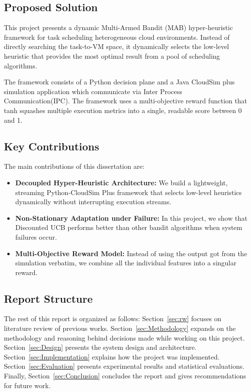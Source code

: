 \subsection{Proposed Solution}
This project presents a dynamic Multi-Armed Bandit (MAB) hyper-heuristic framework for task scheduling heterogeneous cloud environments. Instead of directly searching the task-to-VM space, it dynamically selects the low-level heuristic that provides the most optimal result from a pool of scheduling algorithms.

The framework consists of a Python decision plane and a Java CloudSim plus simulation application which communicate via Inter Process Communication(IPC). The framework uses a multi-objective reward function that tanh squashes multiple execution metrics into a single, readable score between 0 and 1.

\subsection{Key Contributions}
The main contributions of this dissertation are:
\begin{itemize}
    \item \textbf{Decoupled Hyper-Heuristic Architecture:} We build a lightweight, streaming Python-CloudSim Plus framework that selects low-level heuristics dynamically without interrupting execution streams.
    \item \textbf{Non-Stationary Adaptation under Failure:} In this project, we show that Discounted UCB performs better than other bandit algorithms when system failures occur.
    \item \textbf{Multi-Objective Reward Model:} Instead of using the output got from the simulation verbatim, we combine all the individual features into a singular reward.
\end{itemize}

\subsection{Report Structure}
The rest of this report is organized as follows: Section~\ref{sec:rw} focuses on literature review of previous works. Section~\ref{sec:Methodology} expands on the methodology and reasoning behind decisions made while working on this project. Section~\ref{sec:Design} presents the system design and architecture. Section~\ref{sec:Implementation} explains how the project was implemented. Section~\ref{sec:Evaluation} presents experimental results and statistical evaluations. Finally, Section~\ref{sec:Conclusion} concludes the report and gives recommendations for future work.